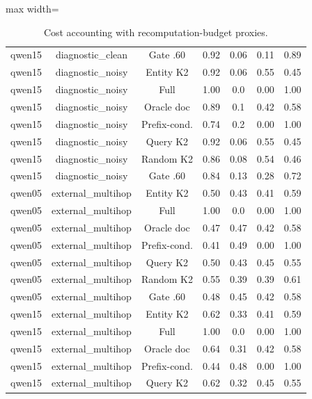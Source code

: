 \begin{table}[t]
\begin{adjustbox}{max width=\textwidth}
\begin{tabular}{ccccccc}
qwen15 & diagnostic\_clean & Gate .60 & 0.92 & 0.06 & 0.11 & 0.89 \\
qwen15 & diagnostic\_noisy & Entity K2 & 0.92 & 0.06 & 0.55 & 0.45 \\
qwen15 & diagnostic\_noisy & Full & 1.00 & 0.0 & 0.00 & 1.00 \\
qwen15 & diagnostic\_noisy & Oracle doc & 0.89 & 0.1 & 0.42 & 0.58 \\
qwen15 & diagnostic\_noisy & Prefix-cond. & 0.74 & 0.2 & 0.00 & 1.00 \\
qwen15 & diagnostic\_noisy & Query K2 & 0.92 & 0.06 & 0.55 & 0.45 \\
qwen15 & diagnostic\_noisy & Random K2 & 0.86 & 0.08 & 0.54 & 0.46 \\
qwen15 & diagnostic\_noisy & Gate .60 & 0.84 & 0.13 & 0.28 & 0.72 \\
qwen05 & external\_multihop & Entity K2 & 0.50 & 0.43 & 0.41 & 0.59 \\
qwen05 & external\_multihop & Full & 1.00 & 0.0 & 0.00 & 1.00 \\
qwen05 & external\_multihop & Oracle doc & 0.47 & 0.47 & 0.42 & 0.58 \\
qwen05 & external\_multihop & Prefix-cond. & 0.41 & 0.49 & 0.00 & 1.00 \\
qwen05 & external\_multihop & Query K2 & 0.50 & 0.43 & 0.45 & 0.55 \\
qwen05 & external\_multihop & Random K2 & 0.55 & 0.39 & 0.39 & 0.61 \\
qwen05 & external\_multihop & Gate .60 & 0.48 & 0.45 & 0.42 & 0.58 \\
qwen15 & external\_multihop & Entity K2 & 0.62 & 0.33 & 0.41 & 0.59 \\
qwen15 & external\_multihop & Full & 1.00 & 0.0 & 0.00 & 1.00 \\
qwen15 & external\_multihop & Oracle doc & 0.64 & 0.31 & 0.42 & 0.58 \\
qwen15 & external\_multihop & Prefix-cond. & 0.44 & 0.48 & 0.00 & 1.00 \\
qwen15 & external\_multihop & Query K2 & 0.62 & 0.32 & 0.45 & 0.55 \\
\bottomrule
\end{tabular}
\end{adjustbox}
\caption{Cost accounting with recomputation-budget proxies.}
\label{tab:app-cost}
\end{table}

